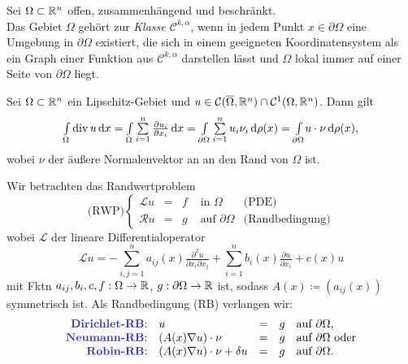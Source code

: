 \documentclass{cheat-sheet}
\newcommand{\Cont}{\mathcal{C}} %
\newcommand{\clos}[1]{\overline{#1}} %
\newcommand{\cOmega}{\clos{\Omega}} %
\newcommand{\bOmega}{\partial \Omega} %
\newcommand{\LL}{\mathcal{L}} %
\newcommand{\RR}{\mathcal{R}} %
\DeclareMathOperator{\dive}{div} %
\begin{document}
\begin{defn}
  Sei $\Omega \subset \mathbb{R}^n$ offen, zusammenhängend und beschränkt. \\
  Das Gebiet $\Omega$ gehört zur \emph{Klasse $\Cont^{k,\alpha}$}, wenn in jedem Punkt $x \in \bOmega$ eine Umgebung in $\bOmega$ existiert, die sich in einem geeigneten Koordinatensystem als ein Graph einer Funktion aus $\Cont^{k,\alpha}$ darstellen lässt und $\Omega$ lokal immer auf einer Seite von $\bOmega$ liegt.
\end{defn}


\begin{satz}
  Sei $\Omega \subset \mathbb{R}^n$ ein Lipschitz-Gebiet und $u \in \Cont(\cOmega, \R^n) \cap \Cont^1(\Omega, \R^n)$.
  Dann gilt
  \[ \Int{\Omega}{}{\dive u}{x} = \Int{\Omega}{}{\sum_{i=1}^n \tfrac{\partial u_i}{\partial x_i}}{x} = \Int{\bOmega}{}{\sum_{i=1}^n u_i \nu_i}{\rho(x)} = \Int{\bOmega}{}{u \cdot \nu}{\rho(x)}, \]
  wobei $\nu$ der äußere Normalenvektor an an den Rand von $\Omega$ ist.
\end{satz}

\begin{prob}
  Wir betrachten das Randwertproblem
  \[
    \text{(RWP)} \left\{ \begin{array}{rllll}
      \LL u &=& f &\text{ in $\Omega$} & \text{(PDE)} \\
      \RR u &=& g &\text{ auf $\bOmega$} & \text{(Randbedingung)}
    \end{array} \right.
  \]
  wobei $\LL$ der lineare Differentialoperator
  \[
    \LL u = - \sum_{i,j=1}^n a_{ij}(x) \tfrac{\partial^2 u}{\partial x_i \partial x_j} + \sum_{i=1}^n b_i(x) \tfrac{\partial u}{\partial x_i} + c(x) u
  \]
  mit Fktn $a_{ij}, b_i, c, f : \Omega \to \mathbb{R}$, $g : \bOmega \to \R$ ist, sodass $A(x) \coloneqq (a_{ij}(x))$ symmetrisch ist.
  Als Randbedingung (RB) verlangen wir:
  \[ \begin{array}{rllll}
    \text{\emph{Dirichlet-RB}:} & u &=& g & \text{auf $\bOmega$,} \\
    \text{\emph{Neumann-RB}:} & (A(x) \nabla u) \cdot \nu &=& g & \text{auf $\bOmega$ oder} \\
    \text{\emph{Robin-RB}:} & (A(x) \nabla u) \cdot \nu + \delta u &=& g & \text{auf $\bOmega$.}
  \end{array} \]
\end{prob}
\end{document}
